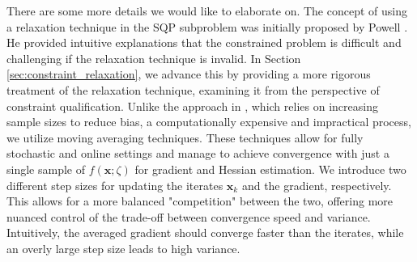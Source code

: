 \documentclass[aos]{imsart}
\numberwithin{equation}{section}
\theoremstyle{plain}
\begin{document}
There are some more details we would like to elaborate on. 
The concept of using a relaxation technique in the SQP subproblem was initially proposed by Powell \cite{powell2006fast}. He provided intuitive explanations that the constrained problem is difficult and challenging if the relaxation technique is invalid. In Section \ref{sec:constraint_relaxation}, we advance this by providing a more rigorous treatment of the relaxation technique, examining it from the perspective of constraint qualification.
Unlike the approach in \cite{curtis2023sequential}, which relies on increasing sample sizes to reduce bias, a computationally expensive and impractical process, we utilize moving averaging techniques. These techniques allow for fully stochastic and online settings and manage to achieve convergence with just a single sample of $f(\bm{x};\zeta)$ for gradient and Hessian estimation. 
We introduce two different step sizes for updating the iterates $\bm{x}_k$ and the gradient, respectively. This allows for a more balanced "competition" between the two, offering more nuanced control of the trade-off between convergence speed and variance. Intuitively, the averaged gradient should converge faster than the iterates, while an overly large step size leads to high variance.
\end{document}
